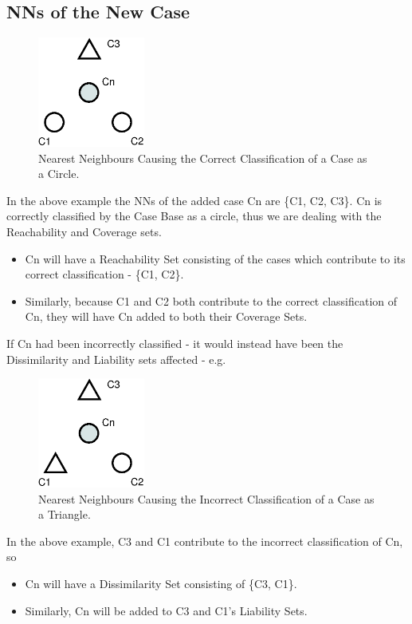 \documentclass[a4paper,11pt]{report}
\begin{document}
\subsection{NNs of the New Case}
\begin{figure}[h!] 
\centering
	\includegraphics[width=100pt]{./Drawn/NNsCorrectlyClassify}
\caption{Nearest Neighbours Causing the Correct Classification of a Case as a Circle.}
\label{fig:NNsCorrect}
\end{figure}

In the above example the NNs of the added case Cn are \{C1, C2, C3\}. Cn is correctly classified by the Case Base as a circle, thus we are dealing with the Reachability and Coverage sets.
\begin{itemize}
	\item Cn will have a Reachability Set consisting of the cases which contribute to its correct classification - \{C1, C2\}.
	\item Similarly, because C1 and C2 both contribute to the correct classification of Cn, they will have Cn added to both their Coverage Sets.
\end{itemize}

If Cn had been incorrectly classified - it would instead have been the Dissimilarity and Liability sets affected - e.g.

\begin{figure}[h!]
  \centering
	\includegraphics[width=100pt]{./Drawn/NNsIncorrectlyClassify}
\caption{Nearest Neighbours Causing the Incorrect Classification of a Case as a Triangle.}

\end{figure}

In the above example, C3 and C1 contribute to the incorrect classification of Cn, so
\begin{itemize}
	\item Cn will have a Dissimilarity Set consisting of \{C3, C1\}.
	\item Similarly, Cn will be added to C3 and C1's Liability Sets.
\end{itemize}
\end{document}
